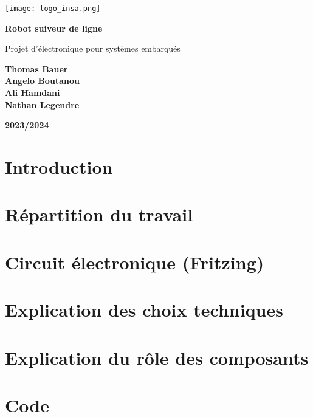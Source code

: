 \documentclass[12pt]{article}
\begin{document}
\begin{titlepage}
    \centering
    
    \texttt{[image: logo\_insa.png]}\par\vspace{1cm}
    
    {\LARGE\bfseries Robot suiveur de ligne\par}
    
    {\Large Projet d'électronique pour systèmes embarqués\par}
    
    \vspace{2cm}
    
    \vfill
    \begin{flushleft}
        \textbf{Thomas Bauer}\\
        \textbf{Angelo Boutanou}\\
        \textbf{Ali Hamdani}\\
        \textbf{Nathan Legendre}
    \end{flushleft}
        \vfill
    \begin{flushright}
        \textbf{2023/2024}
    \end{flushright}
    
\end{titlepage}

\newpage

\section*{Introduction}


\section{Répartition du travail}


\section{Circuit électronique (Fritzing)}


\section{Explication des choix techniques}


\section{Explication du rôle des composants}


\section{Code}


\section{Difficultés rencontrées}

\end{document}
